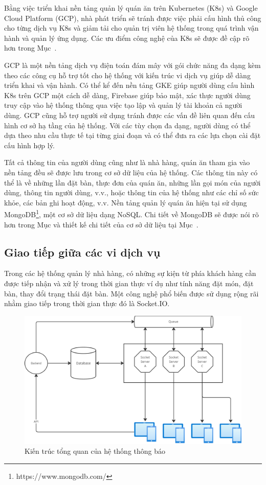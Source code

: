 Bằng việc triển khai nền tảng quản lý quán ăn trên Kubernetes (K8s) và Google Cloud Platform (GCP), nhà phát triển sẽ tránh được việc phải cấu hình thủ công cho từng dịch vụ K8s và giảm tải cho quản trị viên hệ thống trong quá trình vận hành và quản lý ứng dụng.
Các ưu điểm công nghệ của K8s sẽ được đề cập rõ hơn trong Mục~.

GCP là một nền tảng dịch vụ điện toán đám mây với gói chức năng đa dạng kèm theo các công cụ hỗ trợ tốt cho hệ thống với kiến trúc vi dịch vụ giúp dễ dàng triển khai và vận hành.
Có thể kể đến nền tảng GKE giúp người dùng cấu hình K8s trên GCP một cách dễ dàng, Firebase giúp bảo mật, xác thực người dùng truy cập vào hệ thống thông qua việc tạo lập và quản lý tài khoản cả người dùng.
GCP cũng hỗ trợ người sử dụng tránh được các vấn đề liên quan đến cấu hình cơ sở hạ tầng của hệ thống.
Với các tùy chọn đa dạng, người dùng có thể dựa theo nhu cầu thực tế tại từng giai đoạn và có thể đưa ra các lựa chọn cài đặt cấu hình hợp lý.

Tất cả thông tin của người dùng cũng như là nhà hàng, quán ăn tham gia vào nền tảng đều sẽ được lưu trong cơ sở dữ liệu của hệ thống. Các thông tin này có thể là về những lần đặt bàn, thực đơn của quán ăn, những lần gọi món của người dùng, thông tin người dùng, v.v., hoặc thông tin của hệ thống như các chỉ số sức khỏe, các bản ghi hoạt động, v.v. Nền tảng quản lý quán ăn hiện tại sử dụng MongoDB\footnote{https://www.mongodb.com/}, một cơ sở dữ liệu dạng NoSQL. Chi tiết về MongoDB sẽ được nói rõ hơn trong Mục  và thiết kế chi tiết của cơ sở dữ liệu tại Mục~.
\subsection*{Giao tiếp giữa các vi dịch vụ}
Trong các hệ thống quản lý nhà hàng, có những sự kiện từ phía khách hàng cần được tiếp nhận và xử lý trong thời gian thực ví dụ như tính năng đặt món, đặt bàn, thay đổi trạng thái đặt bàn.
Một công nghệ phổ biến được sử dụng rộng rãi nhằm giao tiếp trong thời gian thực đó là Socket.IO.

\begin{figure}[h]
	\centering
	\includegraphics[width=\textwidth]{images/hChip/RabbitMQ/notification-design.png}
	\caption{Kiến trúc tổng quan của hệ thống thông báo}
	\label{fig:notification-design}
\end{figure}

